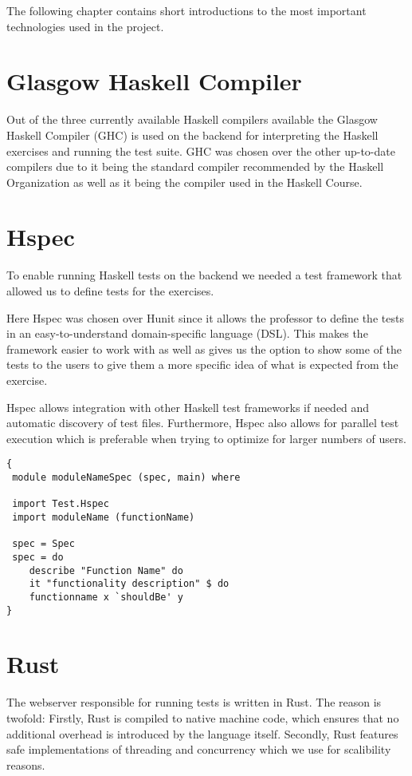 The following chapter contains short introductions to the most important technologies used in the project. 

\section*{Glasgow Haskell Compiler} %
Out of the three currently available Haskell compilers available the Glasgow Haskell Compiler (GHC) is used on the backend for interpreting the Haskell exercises and running the test suite. GHC was chosen over the other up-to-date compilers due to it being the standard compiler recommended by the Haskell Organization \cite{Haskell_GHC} as well as it being the compiler used in the Haskell Course.

\section*{Hspec}
To enable running Haskell tests on the backend we needed a test framework that allowed us to define tests for the exercises. 

Here Hspec was chosen over Hunit since it allows the professor to define the tests in an easy-to-understand domain-specific language (DSL). 
This makes the framework easier to work with as well as gives us the option to show some of the tests to the users to give them a more specific idea of what is expected from the exercise.

Hspec allows integration with other Haskell test frameworks if needed and automatic discovery of test files. 
Furthermore, Hspec also allows for parallel test execution which is preferable when trying to optimize for larger numbers of users.

\begin{lstlisting}[language=CSharp, caption={An example of a Hspec Test.}, label={lst:HspecTestExample}]
{
 module moduleNameSpec (spec, main) where

 import Test.Hspec
 import moduleName (functionName)
 
 spec = Spec
 spec = do
 	describe "Function Name" do
 	it "functionality description" $ do
	functionname x `shouldBe' y
}
\end{lstlisting}

\section*{Rust}
The webserver responsible for running tests is written in Rust. 
The reason is twofold: 
Firstly, Rust is compiled to native machine code, which ensures that no additional overhead is introduced by the language itself. 
Secondly, Rust features safe implementations of threading and concurrency which we use for scalibility reasons.

